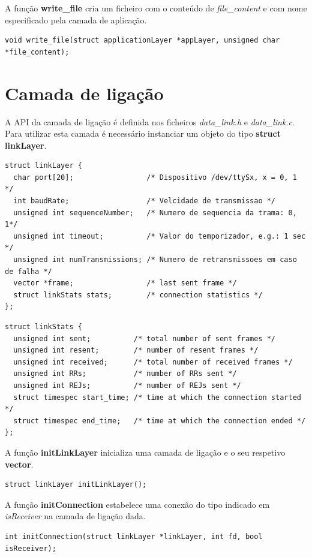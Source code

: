 \documentclass[11pt]{report}
\begin{document}
A função \textbf{write\_file} cria um ficheiro com o conteúdo de \textit{file\_content}
e com nome especificado pela camada de aplicação.
\begin{lstlisting}
void write_file(struct applicationLayer *appLayer, unsigned char *file_content);
\end{lstlisting}

\section{Camada de ligação}

A API da camada de ligação é definida nos ficheiros \textit{data\_link.h} e
\textit{data\_link.c}. Para utilizar esta camada é necessário instanciar um objeto
do tipo \textbf{struct linkLayer}.

\begin{lstlisting}
struct linkLayer {
  char port[20];                 /* Dispositivo /dev/ttySx, x = 0, 1 */
  int baudRate;                  /* Velcidade de transmissao */
  unsigned int sequenceNumber;   /* Numero de sequencia da trama: 0, 1*/
  unsigned int timeout;          /* Valor do temporizador, e.g.: 1 sec */
  unsigned int numTransmissions; /* Numero de retransmissoes em caso de falha */
  vector *frame;                 /* last sent frame */
  struct linkStats stats;        /* connection statistics */
};
\end{lstlisting}

\begin{lstlisting}
struct linkStats {
  unsigned int sent;          /* total number of sent frames */
  unsigned int resent;        /* number of resent frames */
  unsigned int received;      /* total number of received frames */
  unsigned int RRs;           /* number of RRs sent */
  unsigned int REJs;          /* number of REJs sent */
  struct timespec start_time; /* time at which the connection started */
  struct timespec end_time;   /* time at which the connection ended */
};
\end{lstlisting}

A função \textbf{initLinkLayer} inicializa uma camada de ligação e o seu respetivo \textbf{vector}.
\begin{lstlisting}
struct linkLayer initLinkLayer();
\end{lstlisting}

A função \textbf{initConnection} estabelece uma conexão do tipo indicado em \textit{isReceiver}
na camada de ligação dada.
\begin{lstlisting}
int initConnection(struct linkLayer *linkLayer, int fd, bool isReceiver);
\end{lstlisting}
\end{document}
